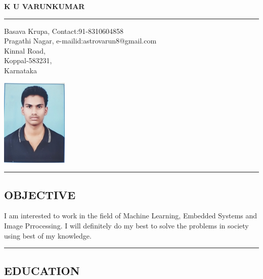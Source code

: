 \documentclass[10pt,letterpaper]{article}
\begin{document}
\begin{center}
\huge 
\textbf {K U VARUNKUMAR}
\end{center}


\hrule
\vspace{1.0em}
Basava Krupa, \hspace{31.8em} Contact:91-8310604858\\ Pragathi Nagar, \hfill e-mailid:astrovarun8@gmail.com \\ Kinnal Road,\\ Koppal-583231,\\Karnataka

\hfill \includegraphics{varun}

\vspace{5.0em}


\hrule
\subsection*{OBJECTIVE}
   I am interested to work in the field of  Machine Learning, Embedded Systems and Image Prrocessing. I will definitely do my best to solve the  problems in society using best of my knowledge. 
\vspace{1.0em}

\hrule
\subsection*{EDUCATION}
\end{document}
